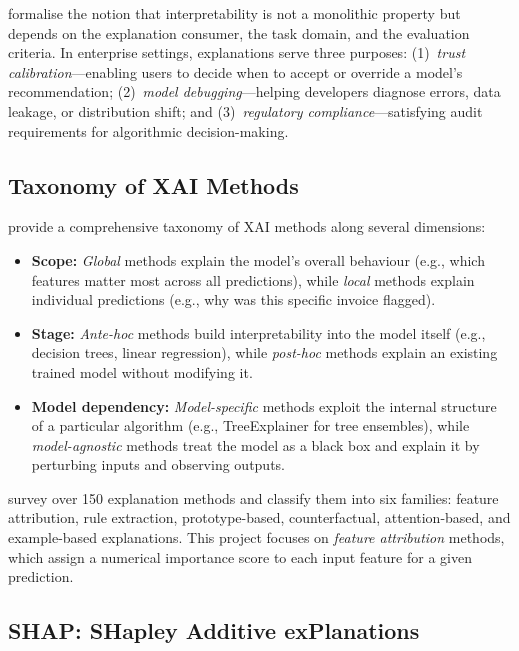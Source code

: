 \documentclass[12pt,a4paper]{report}
\begin{document}
\citet{doshi2017towards} formalise the notion that interpretability is not a monolithic property but depends on the explanation consumer, the task domain, and the evaluation criteria. In enterprise settings, explanations serve three purposes: (1)~\textit{trust calibration}---enabling users to decide when to accept or override a model's recommendation; (2)~\textit{model debugging}---helping developers diagnose errors, data leakage, or distribution shift; and (3)~\textit{regulatory compliance}---satisfying audit requirements for algorithmic decision-making.

\subsection{Taxonomy of XAI Methods}

\citet{arrieta2020explainable} provide a comprehensive taxonomy of XAI methods along several dimensions:

\begin{itemize}
  \item \textbf{Scope:} \textit{Global} methods explain the model's overall behaviour (e.g., which features matter most across all predictions), while \textit{local} methods explain individual predictions (e.g., why was this specific invoice flagged).

  \item \textbf{Stage:} \textit{Ante-hoc} methods build interpretability into the model itself (e.g., decision trees, linear regression), while \textit{post-hoc} methods explain an existing trained model without modifying it.

  \item \textbf{Model dependency:} \textit{Model-specific} methods exploit the internal structure of a particular algorithm (e.g., TreeExplainer for tree ensembles), while \textit{model-agnostic} methods treat the model as a black box and explain it by perturbing inputs and observing outputs.
\end{itemize}

\citet{guidotti2018survey} survey over 150 explanation methods and classify them into six families: feature attribution, rule extraction, prototype-based, counterfactual, attention-based, and example-based explanations. This project focuses on \textit{feature attribution} methods, which assign a numerical importance score to each input feature for a given prediction.

\subsection{SHAP: SHapley Additive exPlanations}
\end{document}
